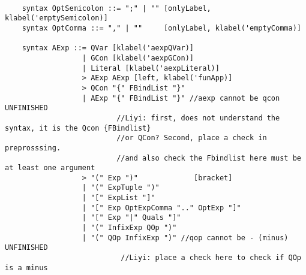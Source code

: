 \begin{lstlisting}

    syntax OptSemicolon ::= ";" | "" [onlyLabel, klabel('emptySemicolon)]
    syntax OptComma ::= "," | ""     [onlyLabel, klabel('emptyComma)]

    syntax AExp ::= QVar [klabel('aexpQVar)]
                  | GCon [klabel('aexpGCon)]
                  | Literal [klabel('aexpLiteral)]
                  > AExp AExp [left, klabel('funApp)]
                  > QCon "{" FBindList "}"
                  | AExp "{" FBindList "}" //aexp cannot be qcon UNFINISHED
                          //Liyi: first, does not understand the syntax, it is the Qcon {FBindlist}
                          //or QCon? Second, place a check in preprosssing.
                          //and also check the Fbindlist here must be at least one argument
                  > "(" Exp ")"             [bracket]
                  | "(" ExpTuple ")"
                  | "[" ExpList "]"
                  | "[" Exp OptExpComma ".." OptExp "]"
                  | "[" Exp "|" Quals "]"
                  | "(" InfixExp QOp ")"
                  | "(" QOp InfixExp ")" //qop cannot be - (minus) UNFINISHED
                           //Liyi: place a check here to check if QOp is a minus
                           
\end{lstlisting}

